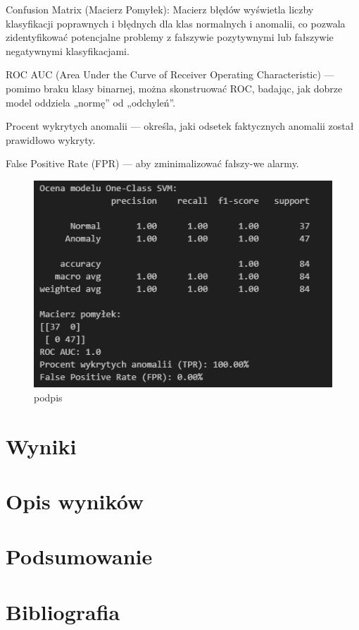 \documentclass[a4paper,fleqn]{cas-dc}
\begin{document}
Confusion Matrix (Macierz Pomyłek): Macierz błędów wyświetla liczby klasyfikacji poprawnych i błędnych dla klas normalnych i anomalii, co pozwala zidentyfikować potencjalne problemy z fałszywie pozytywnymi lub fałszywie negatywnymi klasyfikacjami.

ROC AUC (Area Under the Curve of Receiver Operating Characteristic) — pomimo braku klasy binarnej, można skonstruować ROC, badając, jak dobrze model oddziela „normę” od „odchyleń”.

Procent wykrytych anomalii — określa, jaki odsetek faktycznych anomalii został prawidłowo wykryty.

False Positive Rate (FPR) — aby zminimalizować fałszy-we alarmy.


\begin{figure}[h]
	\includegraphics[scale=.75]{wykresy/ocena1.png}
	\caption{podpis }
	\label{FIG:1}
\end{figure}

\section{Wyniki}

\section{Opis wyników}



\section{Podsumowanie}


\section{Bibliografia}
\end{document}
